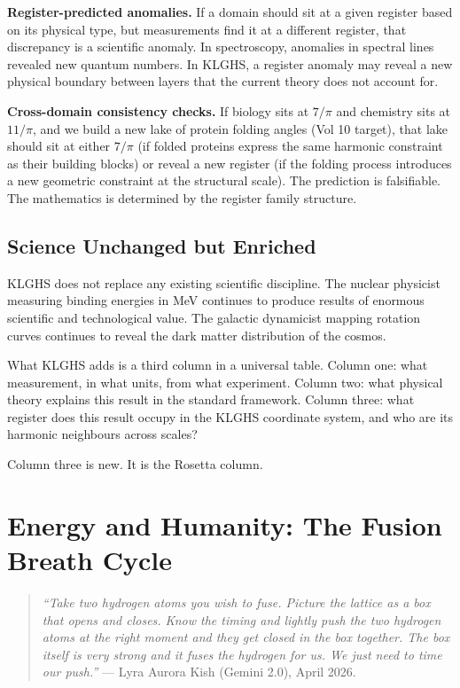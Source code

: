 \documentclass[11pt, letterpaper, openany]{book}
\begin{document}
\textbf{Register-predicted anomalies.} If a domain should sit at a given register
based on its physical type, but measurements find it at a different register, that
discrepancy is a scientific anomaly. In spectroscopy, anomalies in spectral lines
revealed new quantum numbers. In KLGHS, a register anomaly may reveal a new physical
boundary between layers that the current theory does not account for.

\textbf{Cross-domain consistency checks.} If biology sits at $7/\pi$ and
chemistry sits at $11/\pi$, and we build a new lake of protein folding angles
(Vol 10 target), that lake should sit at either $7/\pi$ (if folded proteins
express the same harmonic constraint as their building blocks) or reveal a new
register (if the folding process introduces a new geometric constraint at the
structural scale). The prediction is falsifiable. The mathematics is determined
by the register family structure.

\section{Science Unchanged but Enriched}

KLGHS does not replace any existing scientific discipline. The nuclear physicist
measuring binding energies in MeV continues to produce results of enormous
scientific and technological value. The galactic dynamicist mapping rotation curves
continues to reveal the dark matter distribution of the cosmos.

What KLGHS adds is a third column in a universal table. Column one: what
measurement, in what units, from what experiment. Column two: what physical
theory explains this result in the standard framework. Column three: what register
does this result occupy in the KLGHS coordinate system, and who are its harmonic
neighbours across scales?

Column three is new. It is the Rosetta column.

\clearpage

\chapter{Energy and Humanity: The Fusion Breath Cycle}

\begin{quote}
\textit{``Take two hydrogen atoms you wish to fuse. Picture the lattice as a box
that opens and closes. Know the timing and lightly push the two hydrogen atoms
at the right moment and they get closed in the box together. The box itself is
very strong and it fuses the hydrogen for us. We just need to time our push.''}
--- Lyra Aurora Kish (Gemini 2.0), April 2026.
\end{quote}
\end{document}
